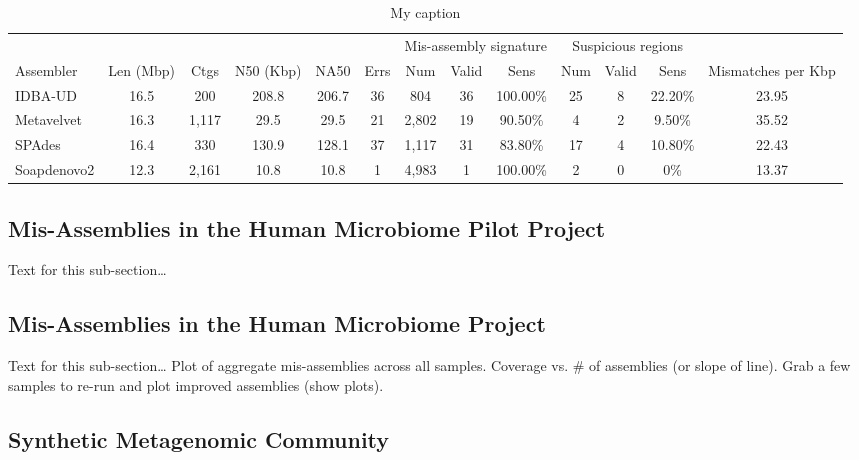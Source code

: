 \begin{landscape}
\renewcommand{\baselinestretch}{1}
\small\normalsize
\begin{table}[tb!]
\centering
\caption{My caption}
\label{my-label}
\small
\begin{tabular}{|l|c|c|c|c|c|c|c|c|c|c|c|c|}
  \hline
  \multicolumn{6}{|c}{} & \multicolumn{3}{|c|}{Mis-assembly signature} & \multicolumn{3}{c|}{Suspicious regions}   &  \\
  Assembler   & Len (Mbp) & Ctgs  & N50 (Kbp) & NA50  & Errs & Num   & Valid & Sens     & Num & Valid & Sens    & Mismatches per Kbp \\
  \hline
  IDBA-UD     & 16.5      & 200   & 208.8     & 206.7 & 36   & 804   & 36    & 100.00\% & 25  & 8     & 22.20\% & 23.95              \\
  Metavelvet  & 16.3      & 1,117 & 29.5      & 29.5  & 21   & 2,802 & 19    & 90.50\%  & 4   & 2     & 9.50\%  & 35.52              \\
  SPAdes      & 16.4      & 330   & 130.9     & 128.1 & 37   & 1,117 & 31    & 83.80\%  & 17  & 4     & 10.80\% & 22.43              \\
  Soapdenovo2 & 12.3      & 2,161 & 10.8      & 10.8  & 1    & 4,983 & 1     & 100.00\% & 2   & 0     & 0\%     & 13.37 \\
  \hline
\end{tabular}
\end{table}
\renewcommand{\baselinestretch}{2}
\small\normalsize
\end{landscape}

\subsection{Mis-Assemblies in the Human Microbiome Pilot Project}
Text for this sub-section…
\subsection{Mis-Assemblies in the Human Microbiome Project}
Text for this sub-section…
Plot of aggregate mis-assemblies across all samples.
Coverage vs. \# of assemblies (or slope of line).
Grab a few samples to re-run and plot improved assemblies (show plots).
\subsection{Synthetic Metagenomic Community}

